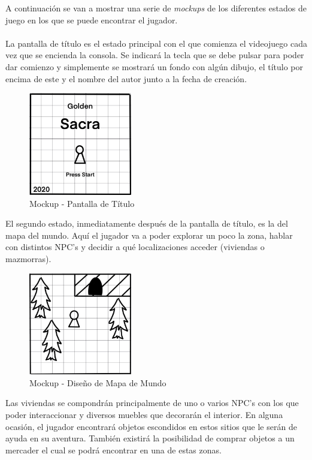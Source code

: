 A continuación se van a mostrar una serie de \textit{mockups} de los diferentes estados de juego en los que se puede encontrar el jugador.
\\ \\
La pantalla de título es el estado principal con el que comienza el videojuego cada vez que se encienda la consola. Se indicará la tecla que se debe pulsar para poder dar comienzo y simplemente se mostrará un fondo con algún dibujo, el título por encima de este y el nombre del autor junto a la fecha de creación.

\begin{figure}[h]
\centering
\includegraphics[width=0.4\textwidth]{include/images/gdd/gdd_title.png}
\caption{Mockup - Pantalla de Título}
\label{figure:gddtitle}
\end{figure}

El segundo estado, inmediatamente después de la pantalla de título, es la del mapa del mundo. Aquí el jugador va a poder explorar un poco la zona, hablar con distintos NPC's y decidir a qué localizaciones acceder (viviendas o mazmorras).

\begin{figure}[h]
\centering
\includegraphics[width=0.4\textwidth]{include/images/gdd/gdd_overworld.png}
\caption{Mockup - Diseño de Mapa de Mundo}
\label{figure:gddoverworld}
\end{figure}

Las viviendas se compondrán principalmente de uno o varios NPC's con los que poder interaccionar y diversos muebles que decorarán el interior. En alguna ocasión, el jugador encontrará objetos escondidos en estos sitios que le serán de ayuda en su aventura. También existirá la posibilidad de comprar objetos a un mercader el cual se podrá encontrar en una de estas zonas.

